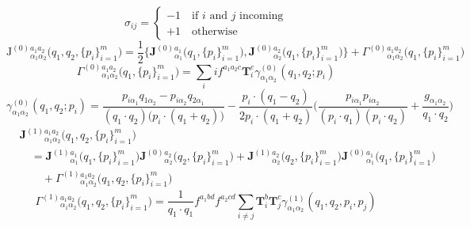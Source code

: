 \documentclass[a4paper,11pt]{article}
\begin{document}
%
\begin{equation}
\sigma_{ij} = \begin{cases} -1 \quad \text{if } i \text{ and } j \text{ incoming} \\
+1 \quad \text{otherwise}
\end{cases}
\end{equation}
%
\begin{equation}
\bm{\mathrm{J}}^{(0)}{}^{a_1 a_2}_{\alpha_1 \alpha_2}\big( q_1, q_2,\{ p_i \}_{i=1}^m \big) = \frac{1}{2} \Big \lbrace \mathbf{J}^{(0)}{}^{a_1}_{\alpha_1} \big( q_1, \{p_i \}_{i = 1}^m \big), \mathbf{J}^{(0)}{}^{a_2}_{\alpha_2}  \big( q_1, \{p_i \}_{i = 1}^m \big) \Big \rbrace + \Gamma^{(0)}{}^{a_1 a_2}_{\alpha_1 \alpha_2} \big( q_1, \{p_i \}_{i = 1}^m \big)
\end{equation}
%
\begin{equation}
\Gamma^{(0)}{}^{a_1 a_2}_{\alpha_1 \alpha_2} \big( q_1, \{p_i \}_{i = 1}^m \big) = \sum_i i f^{a_1 a_2 c} \mathbf{T}_i^c \gamma^{(0)}_{\alpha_1 \alpha_2}(q_1, q_2; p_i)
\end{equation}
%
\begin{equation}
\gamma^{(0)}_{\alpha_1 \alpha_2}(q_1, q_2; p_i) = \frac{p_{i\alpha_1} q_{1\alpha_2} - p_{i \alpha_2} q_{2 \alpha_1}}{(q_1 \cdot q_2) \big( p_i \cdot (q_1 + q_2)\big)} - \frac{p_i \cdot (q_1 - q_2)}{2 p_i \cdot ( q_1 + q_2 )} \bigg( \frac{p_{i \alpha_1} p_{i \alpha_2}}{(p_i \cdot q_1) (p_i \cdot q_2)} + \frac{g_{\alpha_1\alpha_2}}{q_1 \cdot q_2} \bigg)
\end{equation}
%
\begin{align}
&\mathbf{J}^{(1)}{}^{a_1 a_2}_{\alpha_1 \alpha_2}\big( q_1, q_2,\{ p_i \}_{i=1}^m \big) \\
& \quad = \mathbf{J}^{(1)}{}^{a_1}_{ \alpha_1}\big( q_1,\{ p_i \}_{i=1}^m \big) \mathbf{J}^{(0)}{}^{a_2}_{ \alpha_2}\big( q_2,\{ p_i \}_{i=1}^m \big) + \mathbf{J}^{(1)}{}^{a_2}_{\alpha_2}\big( q_2,\{ p_i \}_{i=1}^m \big) \mathbf{J}^{(0)}{}^{a_1}_{\alpha_1}\big( q_1,\{ p_i \}_{i=1}^m \big)  \\
& \qquad + \Gamma^{(1)}{}^{a_1 a_2}_{\alpha_1 \alpha_2}\big( q_1, q_2,\{ p_i \}_{i=1}^m \big)
\end{align}
%
\begin{equation}
\Gamma^{(1)}{}^{a_1 a_2}_{\alpha_1 \alpha_2}\big( q_1, q_2,\{ p_i \}_{i=1}^m \big) = \frac{1}{q_1 \cdot q_1} f^{a_1 b d} f^{a_2 c d} \sum_{i \neq j} \mathbf{T}_i^b \mathbf{T}_j^c \gamma^{(1)}_{\alpha_1 \alpha_2} (q_1, q_2, p_i, p_j)
\end{equation}
%
\end{document}
